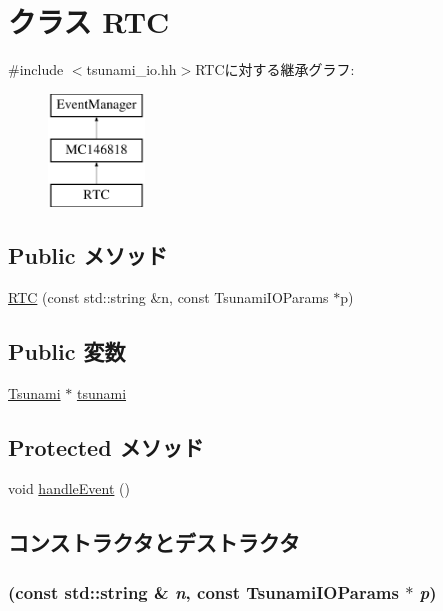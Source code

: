 \hypertarget{classTsunamiIO_1_1RTC}{
\section{クラス RTC}
\label{classTsunamiIO_1_1RTC}
}


{\ttfamily \#include $<$tsunami\_\-io.hh$>$}RTCに対する継承グラフ:\begin{figure}[H]
\begin{center}
\leavevmode
\includegraphics[height=3cm]{classTsunamiIO_1_1RTC}
\end{center}
\end{figure}
\subsection*{Public メソッド}
\begin{DoxyCompactItemize}
\item 
\hyperlink{classTsunamiIO_1_1RTC_ad89ff8b8505ed7ad95353bd84b9be109}{RTC} (const std::string \&n, const TsunamiIOParams $\ast$p)
\end{DoxyCompactItemize}
\subsection*{Public 変数}
\begin{DoxyCompactItemize}
\item 
\hyperlink{classTsunami}{Tsunami} $\ast$ \hyperlink{classTsunamiIO_1_1RTC_aa178467f241f875a068722413f62ec20}{tsunami}
\end{DoxyCompactItemize}
\subsection*{Protected メソッド}
\begin{DoxyCompactItemize}
\item 
void \hyperlink{classTsunamiIO_1_1RTC_af592dd6aaf1c9c6af780a5cbc531417e}{handleEvent} ()
\end{DoxyCompactItemize}


\subsection{コンストラクタとデストラクタ}
\hypertarget{classTsunamiIO_1_1RTC_ad89ff8b8505ed7ad95353bd84b9be109}{
\subsubsection[{RTC}]{ (const std::string \& {\em n}, \/  const TsunamiIOParams $\ast$ {\em p})}}
\label{classTsunamiIO_1_1RTC_ad89ff8b8505ed7ad95353bd84b9be109}


